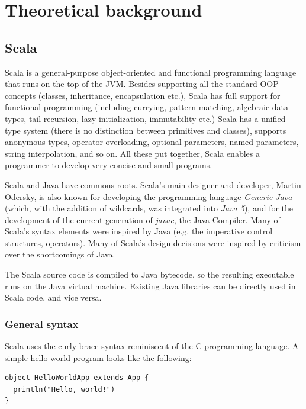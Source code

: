 
\chapter{Theoretical background}\label{chap:theory}


\section{Scala}

Scala is a general-purpose object-oriented and functional programming language that runs on the top of the JVM. Besides supporting all the standard OOP concepts (classes, inheritance, encapsulation etc.), Scala has full support for functional programming (including currying, pattern matching, algebraic data types, tail recursion, lazy initialization, immutability etc.) Scala has a unified type system (there is no distinction between primitives and classes), supports anonymous types, operator overloading, optional parameters, named parameters, string interpolation, and so on. All these put together, Scala enables a programmer to develop very concise and small programs.

Scala and Java have commons roots. Scala's main designer and developer, Martin Odersky, is also known for developing the programming language \emph{Generic Java} (which, with the addition of wildcards, was integrated into \emph{Java 5}), and for the development of the current generation of \emph{javac}, the Java Compiler. Many of Scala's syntax elements were inspired by Java (e.g. the imperative control structures, operators). Many of Scala's design decisions were inspired by criticism over the shortcomings of Java.

The Scala source code is compiled to Java bytecode, so the resulting executable runs on the Java virtual machine. Existing Java libraries can be directly used in Scala code, and vice versa. 

\subsection{General syntax}

Scala uses the curly-brace syntax reminiscent of the C programming language. A simple hello-world program looks like the following:

\begin{lstlisting}
object HelloWorldApp extends App {
  println("Hello, world!")
}
\end{lstlisting}

